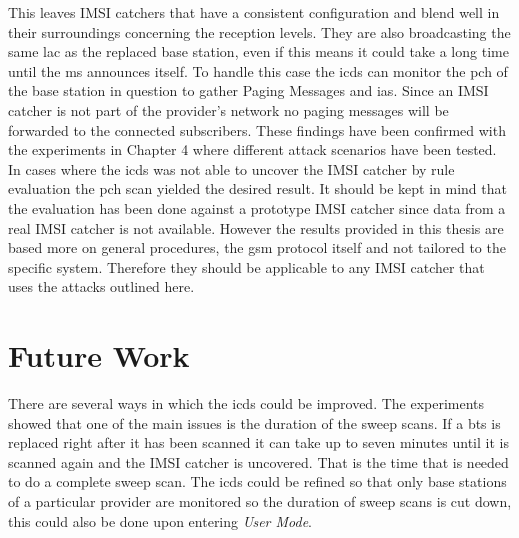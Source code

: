 This leaves IMSI catchers that have a consistent configuration and blend well in their surroundings concerning the reception levels.
They are also broadcasting the same \gls{lac} as the replaced base station, even if this means it could take a long time until the \gls{ms} announces itself.
To handle this case the \gls{icds} can monitor the \gls{pch} of the base station in question to gather Paging Messages and \glspl{ia}.
Since an IMSI catcher is not part of the provider's network no paging messages will be forwarded to the connected subscribers.
These findings have been confirmed with the experiments in Chapter 4 where different attack scenarios have been tested.
In cases where the \gls{icds} was not able to uncover the IMSI catcher by rule evaluation the \gls{pch} scan yielded the desired result.
It should be kept in mind that the evaluation has been done against a prototype IMSI catcher since data from a real IMSI catcher is not available.
However the results provided in this thesis are based more on general procedures, the \gls{gsm} protocol itself and not tailored to the specific system.
Therefore they should be applicable to any IMSI catcher that uses the attacks outlined here.

\section{Future Work}
There are several ways in which the \gls{icds} could be improved.
The experiments showed that one of the main issues is the duration of the sweep scans.
If a \gls{bts} is replaced right after it has been scanned it can take up to seven minutes until it is scanned again and the IMSI catcher is uncovered.
That is the time that is needed to do a complete sweep scan.
The \gls{icds} could be refined so that only base stations of a particular provider are monitored so the duration of sweep scans is cut down, this could also be done upon entering \emph{User Mode}.

